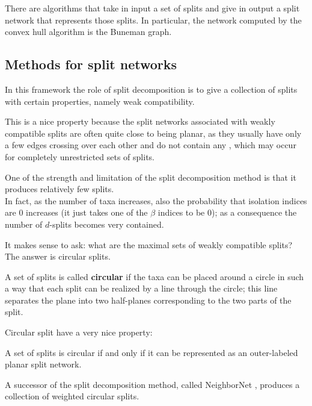 \documentclass[./main.tex]{subfiles}
\begin{document}
There are algorithms that take in input a set of splits and give in output a split network that represents those splits. In particular, the network computed by the convex hull algorithm is the Buneman graph.

\clearpage


\subsection*{Methods for split networks}

In this framework the role of split decomposition is to give a collection of splits with certain properties, namely weak compatibility. 

This is a nice property because the split networks associated with weakly compatible splits are often quite close to being planar, as they usually have only a few edges crossing over each other and do not contain any , which may occur for completely unrestricted sets of splits.

One of the strength and limitation of the split decomposition method is that it produces relatively few splits. \\
In fact, as the number of taxa increases, also the probability that isolation indices are $0$ increases (it just takes one of the $\beta$ indices to be $0$); as a consequence the number of $d$-splits becomes very contained.

It makes sense to ask: what are the maximal sets of weakly compatible splits? The answer is circular splits.

A set of splits is called \textbf{circular} if the taxa can be placed around a circle in such a way that each split can be realized by a line through the circle; this line separates the plane into two half-planes corresponding to the two parts of the split.

Circular split have a very nice property:
\begin{remarklike}[Fact]
    A set of splits is circular if and only if it can be represented as an outer-labeled planar split network.
\end{remarklike}

\begin{figure}[h]
    \centering
\end{figure}

\clearpage

A successor of the split decomposition method, called NeighborNet \cite{BM04,BH23}, produces a collection of weighted circular splits.\bigskip
\end{document}

